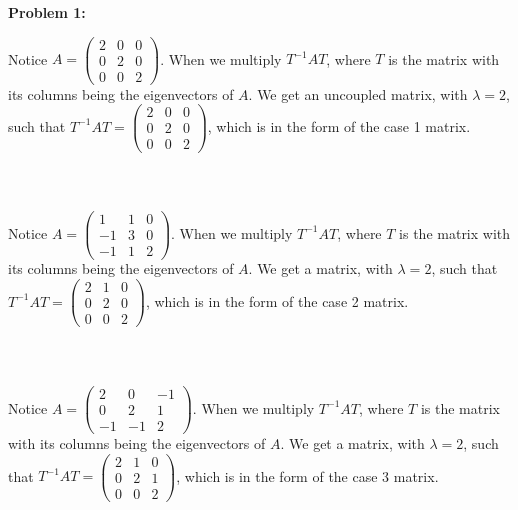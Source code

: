 \documentclass[11pt]{article}
\newenvironment{problem}[1]{\textbf{Problem #1: }}{\newpage}
\begin{document}
\begin{problem}{1}
\begin{enumerate}[label = (\alph*)]
	 		Notice $A = \begin{pmatrix}
	 			2 & 0 & 0 \\
	 			0 & 2 & 0 \\
	 			0 & 0 & 2
	 		\end{pmatrix}$.  When we multiply $T^{-1}AT$, where $T$ is the matrix with its columns being the eigenvectors of $A$.  We get an uncoupled matrix, with $\lambda = 2$, such that $T^{-1}AT = \begin{pmatrix}
	 			2 & 0 & 0 \\ 0 & 2 & 0 \\ 0 & 0 & 2 
	 		\end{pmatrix}$, which is in the form of the case 1 matrix.
	 		\\ \\ \\ \\
	 		Notice $A = \begin{pmatrix}
	 			1 & 1 & 0 \\
	 			-1 & 3 & 0 \\
	 			-1 & 1 & 2
	 		\end{pmatrix}$.  When we multiply $T^{-1}AT$, where $T$ is the matrix with its columns being the eigenvectors of $A$.  We get a matrix, with $\lambda = 2$, such that $T^{-1}AT = \begin{pmatrix}
	 			2 & 1 & 0 \\ 0 & 2 & 0 \\ 0 & 0 & 2 
	 		\end{pmatrix}$, which is in the form of the case 2 matrix.
 			\\ \\ \\ \\
	 		Notice $A = \begin{pmatrix}
	 			2 & 0 & -1 \\
	 			0 & 2 & 1 \\
	 			-1 & -1 & 2
	 		\end{pmatrix}$.  When we multiply $T^{-1}AT$, where $T$ is the matrix with its columns being the eigenvectors of $A$.  We get a matrix, with $\lambda = 2$, such that $T^{-1}AT = \begin{pmatrix}
	 			2 & 1 & 0 \\ 0 & 2 & 1 \\ 0 & 0 & 2 
 		\end{pmatrix}$, which is in the form of the case 3 matrix.
	 	\end{enumerate}
	\end{problem}
\end{document}
